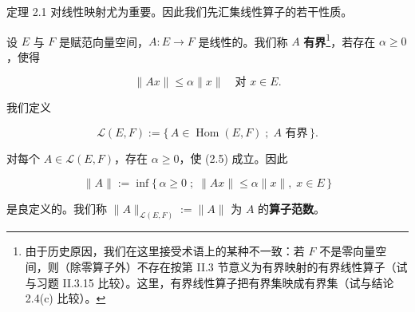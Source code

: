 定理 2.1 对线性映射尤为重要。因此我们先汇集线性算子的若干性质。

设 $ E $ 与 $ F $ 是赋范向量空间，$ A : E \to F $ 是线性的。我们称 $ A $ \textbf{有界}\footnote{由于历史原因，我们在这里接受术语上的某种不一致：若 $ F $ 不是零向量空间，则（除零算子外）不存在按第 II.3 节意义为有界映射的有界线性算子（试与习题 II.3.15 比较）。这里，有界线性算子把有界集映成有界集（试与结论 2.4(c) 比较）。}，若存在 $ \alpha \ge 0 $，使得

\begin{equation}
\|Ax\| \le \alpha \|x\| \quad \text{对 } x \in E.\tag{2.5}
\end{equation}

我们定义

\[
\mathcal{L}(E, F) := \{\, A \in \operatorname{Hom}(E, F) \;;\; A \text{ 有界} \,\}.
\]

对每个 $ A \in \mathcal{L}(E, F) $，存在 $ \alpha \ge 0 $，使 (2.5) 成立。因此

\[
\|A\| := \inf\{\, \alpha \ge 0 \;;\; \|Ax\| \le \alpha \|x\|, \; x \in E \,\}
\]

是良定义的。我们称 $ \|A\|_{\mathcal{L}(E, F)} := \|A\| $ 为 $ A $ 的\textbf{算子范数}。

